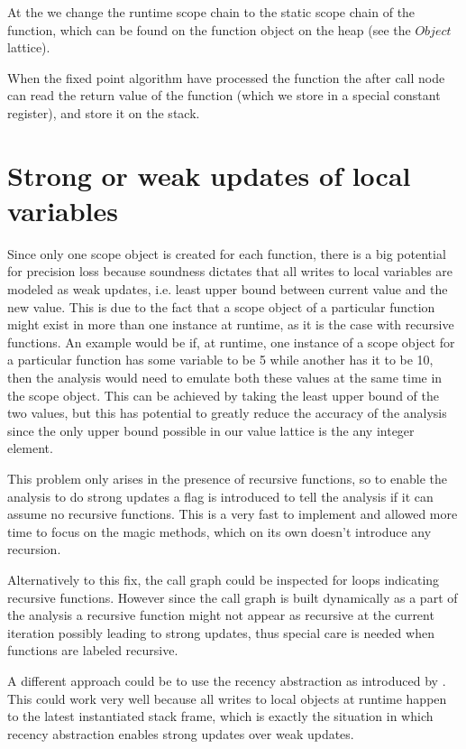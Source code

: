 At the  we change the runtime scope chain to the static scope chain of the function, which can be found on the function object on the heap (see the $Object$ lattice).

When the fixed point algorithm have processed the function the after call node can read the return value of the function (which we store in a special constant register), and store it on the stack.

\section{Strong or weak updates of local variables}
Since only one scope object is created for each function, there is a big potential for precision loss because soundness dictates that all writes to local variables are modeled as weak updates, i.e. least upper bound between current value and the new value. This is due to the fact that a scope object of a particular function might exist in more than one instance at runtime, as it is the case with recursive functions. An example would be if, at runtime, one instance of a scope object for a particular function has some variable  to be 5 while another has it to be 10, then the analysis would need to emulate both these values at the same time in the scope object. This can be achieved by taking the least upper bound of the two values, but this has potential to greatly reduce the accuracy of the analysis since the only upper bound possible in our value lattice is the any integer element.

This problem only arises in the presence of recursive functions, so to enable the analysis to do strong updates a flag is introduced to tell the analysis if it can assume no recursive functions. This is a very fast to implement and allowed more time to focus on the magic methods, which on its own doesn't introduce any recursion.

Alternatively to this fix, the call graph could be inspected for loops indicating recursive functions. However since the call graph is built dynamically as a part of the analysis a recursive function might not appear as recursive at the current iteration possibly leading to strong updates, thus special care is needed when functions are labeled recursive.

A different approach could be to use the recency abstraction as introduced by \cite{recency}. This could work very well because all writes to local objects at runtime happen to the latest instantiated stack frame, which is exactly the situation in which recency abstraction enables strong updates over weak updates.

